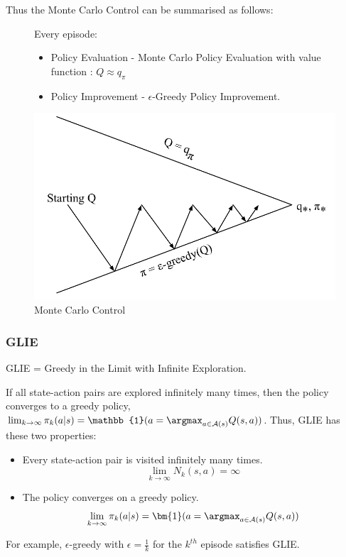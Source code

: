 Thus the Monte Carlo Control can be summarised as follows:
\begin{figure}[H]
  \begin{minipage}{0.5\textwidth}
    Every episode:
      \begin{itemize}
          \item Policy Evaluation - Monte Carlo Policy Evaluation with value function : 
          \(Q \approx q_\pi \) 
          \item Policy Improvement - \(\epsilon \)-Greedy Policy Improvement.
        \end{itemize}
  \end{minipage}%
  \begin{minipage}{0.5\textwidth}
    \centering
    \includegraphics[width=\textwidth]{figures/mc-eps.png}
    \caption{Monte Carlo Control}
    \label{fig:mc-eps}
  \end{minipage}
\end{figure}

\subsubsection{GLIE}
GLIE = Greedy in the Limit with Infinite Exploration.

\begin{theorem}
  If all state-action pairs are explored infinitely many times, then the policy converges
  to a greedy policy, \(\lim_{k \to \infty} \pi_k(a|s) = \mathbb{1}(a = \argmax_{a \in
  \mathcal{A}(s)} Q(s,a))\).
  Thus, GLIE has these two properties:
  \begin{itemize}
    \item Every state-action pair is visited infinitely many times.
    \[
      \lim_{k \to \infty} N_k(s,a) = \infty
    \]
    \item The policy converges on a greedy policy.
    \[
      \lim_{k \to \infty} \pi_k(a|s) = \bm{1}(a = \argmax_{a \in \mathcal{A}(s)} Q(s,a))
    \]
  \end{itemize}
\end{theorem}
For example, \(\epsilon\)-greedy with \(\epsilon = \frac{1}{k}\) for the \(k^{th}\) episode
satisfies GLIE.

